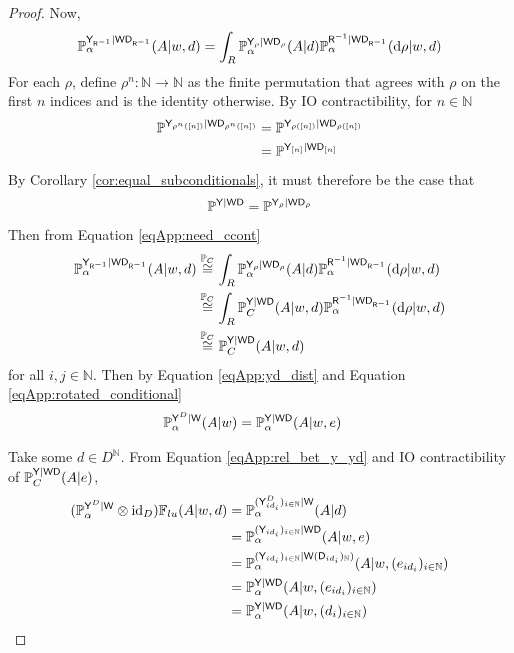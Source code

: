 \begin{proof}
Now,
\begin{align}
    \mathbb{P}^{\mathsf{Y}_{\mathsf{R}^{-1}}|\mathsf{W}\mathsf{D}_{\mathsf{R}^{-1}}}_\alpha(A|w,d) &= \int_R \mathbb{P}_\alpha^{\mathsf{Y}_\rho|\mathsf{W}\mathsf{D}_{\rho}}(A|d)\mathbb{P}_\alpha^{\mathsf{R}^{-1}|\mathsf{W}\mathsf{D}_{\mathsf{R}^{-1}}}(\mathrm{d}\rho|w,d)\label{eqApp:need_ccont}\\
\end{align}
For each $\rho$, define $\rho^n:\mathbb{N}\to \mathbb{N}$ as the finite permutation that agrees with $\rho$ on the first $n$ indices and is the identity otherwise. By IO contractibility, for $n\in \mathbb{N}$
\begin{align}
    \mathbb{P}^{\mathsf{Y}_{\rho^n([n])}|\mathsf{W}\mathsf{D}_{\rho^n([n])}} &= \mathbb{P}^{\mathsf{Y}_{\rho([n])}|\mathsf{W}\mathsf{D}_{\rho([n])}}\\
    &= \mathbb{P}^{\mathsf{Y}_{[n]}|\mathsf{W}\mathsf{D}_{[n]}}
\end{align}
By Corollary \ref{cor:equal_subconditionals}, it must therefore be the case that
\begin{align}
    \mathbb{P}^{\mathsf{Y}|\mathsf{W}\mathsf{D}} = \mathbb{P}^{\mathsf{Y}_{\rho}|\mathsf{W}\mathsf{D}_{\rho}}
\end{align}
Then from Equation \eqref{eqApp:need_ccont}
\begin{align}
    \mathbb{P}^{\mathsf{Y}_{\mathsf{R}^{-1}}|\mathsf{W}\mathsf{D}_{\mathsf{R}^{-1}}}_\alpha(A|w,d) &\overset{\mathbb{P}_C}{\cong} \int_R \mathbb{P}_\alpha^{\mathsf{Y}_\rho|\mathsf{W}\mathsf{D}_{\rho}}(A|d)\mathbb{P}_\alpha^{\mathsf{R}^{-1}|\mathsf{W}\mathsf{D}_{\mathsf{R}^{-1}}}(\mathrm{d}\rho|w,d)\\
    &\overset{\mathbb{P}_C}{\cong} \int_R \mathbb{P}_C^{\mathsf{Y}|\mathsf{WD}}(A|w,d)\mathbb{P}_\alpha^{\mathsf{R}^{-1}|\mathsf{W}\mathsf{D}_{\mathsf{R}^{-1}}}(\mathrm{d}\rho|w,d)\\
    &\overset{\mathbb{P}_C}{\cong} \mathbb{P}_C^{\mathsf{Y}|\mathsf{WD}}(A|w,d)\label{eqApp:rotated_conditional}
\end{align}
 for all $i,j\in \mathbb{N}$. Then by Equation \eqref{eqApp:yd_dist} and Equation \eqref{eqApp:rotated_conditional}
\begin{align}
    \mathbb{P}_\alpha^{\mathsf{Y}^D|\mathsf{W}}(A|w) &= \mathbb{P}_\alpha^{\mathsf{Y}|\mathsf{WD}}(A|w,e)\label{eqApp:rel_bet_y_yd}
\end{align}

Take some $d\in D^{\mathbb{N}}$. From Equation \eqref{eqApp:rel_bet_y_yd} and IO contractibility of $\mathbb{P}_C^{\mathsf{Y}|\mathsf{WD}}(A|e)$,
\begin{align}
    (\mathbb{P}_\alpha^{\mathsf{Y}^D|\mathsf{W}}\otimes \mathrm{id}_D)\mathbb{F}_{lu}(A|w,d) &= \mathbb{P}_\alpha^{(\mathsf{Y}^D_{i d_i})_{i\in \mathbb{N}}|\mathsf{W}}(A|d)\\
    &=\mathbb{P}_\alpha^{(\mathsf{Y}_{i d_i})_{i\in \mathbb{N}}|\mathsf{WD}}(A|w,e)\\
    &= \mathbb{P}_\alpha^{(\mathsf{Y}_{i d_i})_{i\in \mathbb{N}}|\mathsf{W}(\mathsf{D}_{i d_i})_{\mathbb{N}})}(A|w,(e_{i d_i})_{i\in \mathbb{N}})\\
    &= \mathbb{P}_\alpha^{\mathsf{Y}|\mathsf{WD}}(A|w,(e_{i d_i})_{i\in \mathbb{N}})\\
    &= \mathbb{P}_\alpha^{\mathsf{Y}|\mathsf{WD}}(A|w,(d_i)_{i\in\mathbb{N}})
\end{align}


\end{proof}
